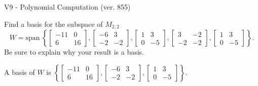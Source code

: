 \begin{exercise}
  \begin{exerciseTitle}V9 - Polynomial Computation (ver. 855)\end{exerciseTitle}
  \begin{exerciseStatement}
    Find a basis for the subspace of \(M_{2,2}\) 
\[W=\mathrm{span}\ \left\{\left[\begin{array}{cc}
-11 & 0 \\
6 & 16
\end{array}\right] , \left[\begin{array}{cc}
-6 & 3 \\
-2 & -2
\end{array}\right] , \left[\begin{array}{cc}
1 & 3 \\
0 & -5
\end{array}\right] , \left[\begin{array}{cc}
3 & -2 \\
-2 & -2
\end{array}\right] , \left[\begin{array}{cc}
1 & 3 \\
0 & -5
\end{array}\right]\right\}.\]
 Be sure to explain why your result is a basis.


  \end{exerciseStatement}
  \begin{exerciseAnswer}
   A basis of \(W\) is  \(\left\{\left[\begin{array}{cc}
-11 & 0 \\
6 & 16
\end{array}\right] , \left[\begin{array}{cc}
-6 & 3 \\
-2 & -2
\end{array}\right] , \left[\begin{array}{cc}
1 & 3 \\
0 & -5
\end{array}\right]\right\}\).
  


  \end{exerciseAnswer}
\end{exercise}
